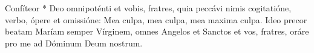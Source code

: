 Confíteor * Deo omnipoténti et
vobis, fratres, quia peccávi nimis
cogitatióne, verbo, ópere et
omissióne:
Mea culpa, mea culpa,
mea maxima culpa.
Ideo precor beatam Maríam
semper Vírginem, omnes Angelos
et Sanctos et vos, fratres, oráre pro
me ad Dóminum Deum nostrum.
